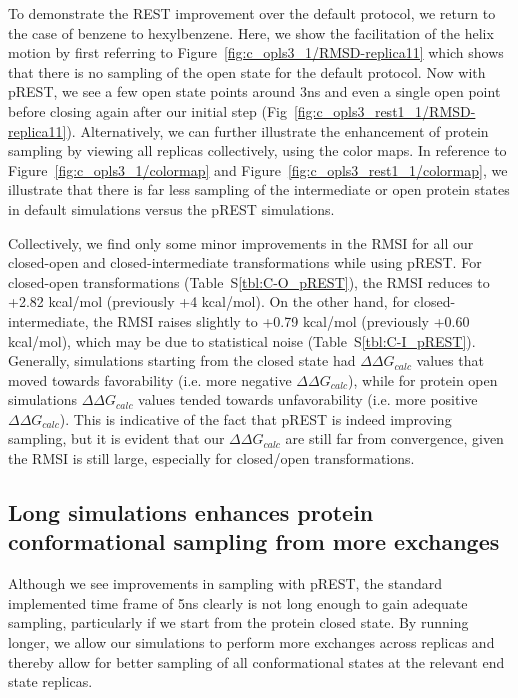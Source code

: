 \documentclass[journal=jctcce,manuscript=article]{achemso}
\begin{document}
To demonstrate the REST improvement over the default protocol, we return to the case of benzene to hexylbenzene.
Here, we show the facilitation of the helix motion by first referring to Figure~\ref{fig:c_opls3_1/RMSD-replica11} which shows that there is no sampling of the open state for the default protocol.
Now with pREST, we see a few open state points around 3ns and even a single open point before closing again after our initial step (Fig~\ref{fig:c_opls3_rest1_1/RMSD-replica11}).
Alternatively, we can further illustrate the enhancement of protein sampling by viewing all replicas collectively, using the color maps.
In reference to Figure~\ref{fig:c_opls3_1/colormap} and Figure~\ref{fig:c_opls3_rest1_1/colormap}, we illustrate that there is far less sampling of the intermediate or open protein states in default simulations versus the pREST simulations.
 
Collectively, we find only some minor improvements in the RMSI for all our closed-open and closed-intermediate transformations while using pREST. 
For closed-open transformations (Table~S\ref{tbl:C-O_pREST}), the RMSI reduces to +2.82 kcal/mol (previously +4 kcal/mol). 
On the other hand, for closed-intermediate, the RMSI raises slightly to +0.79 kcal/mol (previously +0.60 kcal/mol), which may be due to statistical noise (Table~S\ref{tbl:C-I_pREST}).
Generally, simulations starting from the closed state had $\Delta\Delta G_{calc}$ values that moved towards favorability (i.e. more negative $\Delta\Delta G_{calc}$), while for protein open simulations $\Delta\Delta G_{calc}$ values tended towards unfavorability (i.e. more positive $\Delta\Delta G_{calc}$).
This is indicative of the fact that pREST is indeed improving sampling, but it is evident that our $\Delta\Delta G_{calc}$ are still far from convergence, given the RMSI is still large, especially for closed/open transformations.

\subsection*{Long simulations enhances protein conformational sampling from more exchanges}
Although we see improvements in sampling with pREST, the standard implemented time frame of 5ns clearly is not long enough to gain adequate sampling, particularly if we start from the protein closed state.
By running longer, we allow our simulations to perform more exchanges across replicas and thereby allow for better sampling of all conformational states at the relevant end state replicas.
\end{document}
